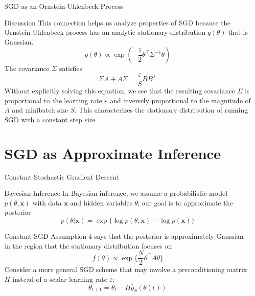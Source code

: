 \documentclass{beamer}
\begin{document}
\begin{frame}{SGD as an Ornstein-Uhlenbeck Process}
    \begin{block}{Discussion}
        This connection helps us analyze properties of SGD because the Ornstein-Uhlenbeck process has an analytic stationary distribution $q(\theta)$ that is Gaussian. 
        \begin{equation}\label{stationary_OU_distribution}
            q(\theta) \propto \exp{\left(-\dfrac{1}{2}\theta^{\top}\Sigma^{-1}\theta\right)}
        \end{equation}
        The covariance $\Sigma$ satisfies
        \begin{equation}\label{Sigma_equation}
            \Sigma A + A\Sigma = \dfrac{\varepsilon}{S}BB^{\top}
        \end{equation}
        Without explicitly solving this equation, we see that the resulting covariance $\Sigma$ is proportional to the learning rate $\varepsilon$ and inversely proportional to the magnitude of $A$ and minibatch size $S$. This characterizes the stationary distribution of running SGD with a constant step size.
    \end{block}
\end{frame}

\section{SGD as Approximate Inference}

\begin{frame}{Constant Stochastic Gradient Descent}
    \begin{block}{Bayesian Inference}
      In Bayesian inference, we assume a probabilistic model $p(\theta, \boldsymbol{x})$ with data $\boldsymbol{x}$ and hidden variables $\theta$; our goal is to approximate the posterior
    \begin{equation}\label{bayesian_inference}
        p(\theta \vert \boldsymbol{x}) = \exp{\{\log p(\theta, \boldsymbol{x}) - \log p(\boldsymbol{x})\}}
    \end{equation}  
    \end{block}
    \begin{block}{Constant SGD}
        Assumption 4 says that the posterior is approximately Gaussian in the region that the stationary distribution focuses on  
        \begin{equation}\label{assump_4_posterior}
            f(\theta) \propto \exp{\{\dfrac{N}{2}\theta^{\top}A\theta\}}
        \end{equation}
        Consider a more general SGD scheme that may involve a preconditioning matrix $H$ instead of a scalar learning rate $\varepsilon$:
        \begin{equation}\label{general_SGD}
            \theta_{t+1} = \theta_{t} - H \hat{g}_S(\theta(t))
        \end{equation}
    \end{block}
\end{frame}
        
\end{document}
